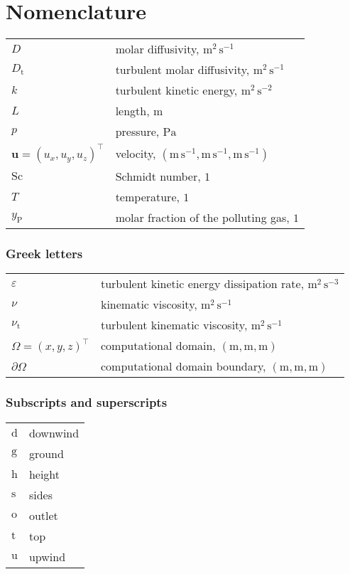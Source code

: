 \section{Nomenclature}
\label{sec:nomen}

\begin{tabular}{ll}
$D$ & molar diffusivity, $\mathrm{m^2\,s^{-1}}$ \\
$D_{\mathrm{t}}$ & turbulent molar diffusivity, $\mathrm{m^2\,s^{-1}}$ \\
$k$ & turbulent kinetic energy, $\mathrm{m^2\,s^{-2}}$ \\
$L$ & length, $\mathrm{m}$ \\
$p$ & pressure, $\mathrm{Pa}$ \\
$\bm{u} = (u_x, u_y, u_z)^\intercal$ & velocity, $\mathrm{(m\,s^{-1},m\,s^{-1},m\,s^{-1})}$ \\
$\mathrm{Sc}$ & Schmidt number, $\mathrm{1}$ \\
${T}$ & temperature, $\mathrm{1}$ \\
$y_{\mathrm{P}}$ & molar fraction of the polluting gas, $\mathrm{1}$ \\
\end{tabular}

\subsubsection*{Greek letters}
\begin{tabular}{ll}
$\varepsilon$ & turbulent kinetic energy dissipation rate, $\mathrm{m^2\,s^{-3}}$\\
$\nu$ & kinematic viscosity, $\mathrm{m^2\,s^{-1}}$\\
$\nu_{\mathrm{t}}$ & turbulent kinematic viscosity, $\mathrm{m^2\,s^{-1}}$\\
$\Omega = (x,y,z)^\intercal$ & computational domain, $\mathrm{(m,m,m)}$\\
$\partial\Omega$ & computational domain boundary, $\mathrm{(m,m,m)}$\\
\end{tabular}

\subsubsection*{Subscripts and superscripts}
\begin{tabular}{ll}
$\mathrm{d}$ & downwind \\
$\mathrm{g}$ & ground \\
$\mathrm{h}$ & height \\
$\mathrm{s}$ & sides \\
$\mathrm{o}$ & outlet \\
$\mathrm{t}$ & top \\
$\mathrm{u}$ & upwind \\
\end{tabular}
